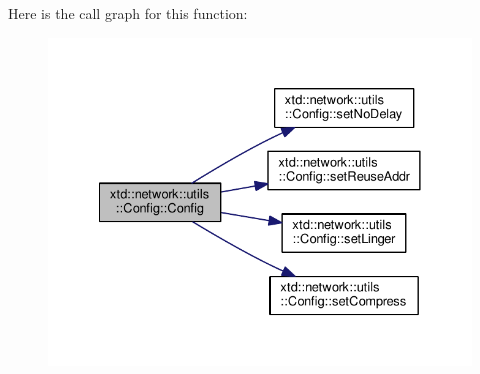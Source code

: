 Here is the call graph for this function\-:
\nopagebreak
\begin{figure}[H]
\begin{center}
\leavevmode
\includegraphics[width=332pt]{classxtd_1_1network_1_1utils_1_1Config_abbf53027f45806e78cec4f50e4ea7def_cgraph}
\end{center}
\end{figure}




